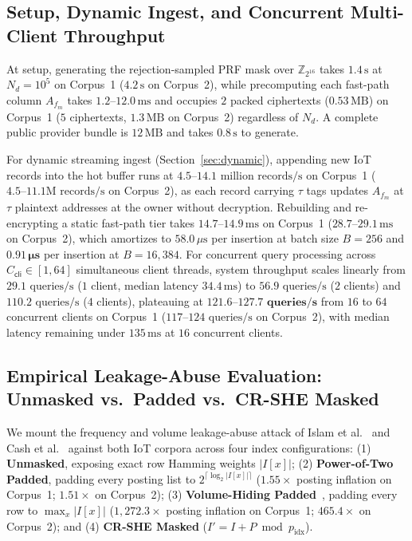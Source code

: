 \documentclass[11pt,a4paper]{article}
\begin{document}
\subsection{Setup, Dynamic Ingest, and Concurrent Multi-Client Throughput}\label{sec:eval_ingest}

At setup, generating the rejection-sampled PRF mask over $\mathbb{Z}_{2^{16}}$ takes $1.4\,\text{s}$ at $N_d = 10^5$ on Corpus~1 ($4.2\,\text{s}$ on Corpus~2), while precomputing each fast-path column $A_{f_m}$ takes $1.2\text{--}12.0\,\text{ms}$ and occupies $2$ packed ciphertexts ($0.53\,\text{MB}$) on Corpus~1 ($5$ ciphertexts, $1.3\,\text{MB}$ on Corpus~2) regardless of $N_d$. A complete public provider bundle is $12\,\text{MB}$ and takes $0.8\,\text{s}$ to generate.

For dynamic streaming ingest (Section~\ref{sec:dynamic}), appending new IoT records into the hot buffer runs at $4.5\text{--}14.1\text{ million records/s}$ on Corpus~1 ($4.5\text{--}11.1\text{M records/s}$ on Corpus~2), as each record carrying $\tau$ tags updates $A_{f_m}$ at $\tau$ plaintext addresses at the owner without decryption. Rebuilding and re-encrypting a static fast-path tier takes $14.7\text{--}14.9\,\text{ms}$ on Corpus~1 ($28.7\text{--}29.1\,\text{ms}$ on Corpus~2), which amortizes to $58.0\,\mu\text{s}$ per insertion at batch size $B = 256$ and $\mathbf{0.91\,\mu\text{s}}$ per insertion at $B = 16{,}384$. For concurrent query processing across $C_{\mathsf{cli}} \in [1, 64]$ simultaneous client threads, system throughput scales linearly from $29.1\text{ queries/s}$ ($1$ client, median latency $34.4\,\text{ms}$) to $56.9\text{ queries/s}$ ($2$ clients) and $110.2\text{ queries/s}$ ($4$ clients), plateauing at $\mathbf{121.6\text{--}127.7\text{ queries/s}}$ from $16$ to $64$ concurrent clients on Corpus~1 ($117\text{--}124\text{ queries/s}$ on Corpus~2), with median latency remaining under $135\,\text{ms}$ at $16$ concurrent clients.

\subsection{Empirical Leakage-Abuse Evaluation: Unmasked vs.\ Padded vs.\ CR-SHE Masked}\label{sec:eval_leakage}

We mount the frequency and volume leakage-abuse attack of Islam et al.~\cite{islam2012} and Cash et al.~\cite{cash2015} against both IoT corpora across four index configurations: (1) \textbf{Unmasked}, exposing exact row Hamming weights $|I[x]|$; (2) \textbf{Power-of-Two Padded}, padding every posting list to $2^{\lceil\log_2 |I[x]|\rceil}$ ($1.55\times$ posting inflation on Corpus~1; $1.51\times$ on Corpus~2); (3) \textbf{Volume-Hiding Padded}~\cite{kamara2019,patel2019}, padding every row to $\max_x |I[x]|$ ($1{,}272.3\times$ posting inflation on Corpus~1; $465.4\times$ on Corpus~2); and (4) \textbf{CR-SHE Masked} ($I' = I + P \bmod p_{\mathrm{idx}}$).
\end{document}
